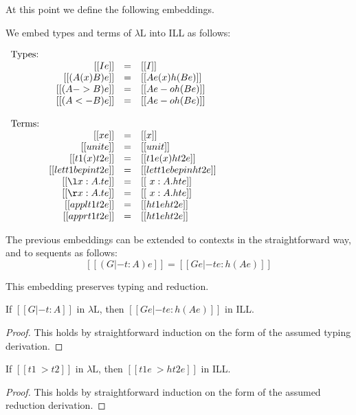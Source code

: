 \documentclass{lmcs}
\begin{document}
At this point we define the following embeddings.
\begin{defi}
  \label{def:lambda-L_to_ILL}
  We embed types and terms of $\lambda\text{L}$ into ILL as follows:
  \begin{center}
    \begin{math}
      \begin{array}{lrllllllllllllllllll}
        \text{Types:}\\
        & [[I e]] & = & [[I]]\\
        & [[(A (x) B) e]] & = & [[A e (x) h(B e)]]\\
        & [[(A -> B) e]] & = & [[A e -o h(B e)]]\\
        & [[(A <- B) e]] & = & [[A e -o h(B e)]]\\                    
        \\
        \text{Terms:}\\
        & [[x e]] & = & [[x]]\\
        & [[unit e]] & = & [[unit]]\\
        & [[{t1 (x) t2} e]] & = & [[t1 e (x) h{t2 e}]]\\
        & [[{let t1 be p in t2} e]] & = & [[let t1 e be p in h{t2 e}]]\\
        & [[{\l x : A.t} e]] & = & [[\ x : A.h{t e}]]\\
        & [[{\r x : A.t} e]] & = & [[\ x : A.h{t e}]]\\
        & [[{appl t1 t2} e]] & = & [[h{t1 e} h{t2 e}]]\\
        & [[{appr t1 t2} e]] & = & [[h{t1 e} h{t2 e}]]\\
      \end{array}
    \end{math}
  \end{center}
  The previous embeddings can be extended to contexts in the
  straightforward way, and to sequents as follows:
  \[ [[(G |- t : A) e]] = [[G e |- t e : h(A e)]]\]
\end{defi}
\noindent
This embedding preserves typing and reduction.
\begin{lem}
  \label{lemma:type_preserving_embedding}
  If $[[G |- t : A]]$ in $\lambda\text{L}$, then
  $[[G e |- t e : h(A e)]]$ in ILL.
\end{lem}
\begin{proof}
  This holds by straightforward induction on the form of the assumed
  typing derivation.
\end{proof}
\begin{lem}
  \label{lemma:reduction_preserving_embedding}
  If $[[t1 ~> t2]]$ in $\lambda\text{L}$, then $[[t1 e ~> h{t2 e}]]$
  in ILL.
\end{lem}
\begin{proof}
  This holds by straightforward induction on the form of the assumed
  reduction derivation.
\end{proof}
\end{document}

